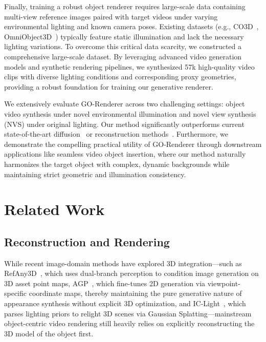 \documentclass[runningheads]{llncs}
\begin{document}
Finally, training a robust object renderer requires large-scale data containing multi-view reference images paired with target videos under varying environmental lighting and known camera poses. Existing datasets (e.g., CO3D~\cite{co3d}, OmniObject3D~\cite{omniobject3d}) typically feature static illumination and lack the necessary lighting variations. To overcome this critical data scarcity, we constructed a comprehensive large-scale dataset. By leveraging advanced video generation models and synthetic rendering pipelines, we synthesized 57k high-quality video clips with diverse lighting conditions and corresponding proxy geometries, providing a robust foundation for training our generative renderer.

We extensively evaluate GO-Renderer across two challenging settings: object video synthesis under novel environmental illumination and novel view synthesis (NVS) under original lighting. Our method significantly outperforms current state-of-the-art diffusion~\cite{videoxfun} or reconstruction methods~\cite{anysplat,reconviagen}. Furthermore, we demonstrate the compelling practical utility of GO-Renderer through downstream applications like seamless video object insertion, where our method naturally harmonizes the target object with complex, dynamic backgrounds while maintaining strict geometric and illumination consistency.


\section{Related Work}
\label{sec:related}

\subsection{Reconstruction and Rendering}
While recent image-domain methods have explored 3D integration—such as RefAny3D~\cite{refany3d}, which uses dual-branch perception to condition image generation on 3D asset point maps, AGP~\cite{sweetdreamer}, which fine-tunes 2D generation via viewpoint-specific coordinate maps, thereby maintaining the pure generative nature of appearance synthesis without explicit 3D optimization, and IC-Light~\cite{iclight}, which parses lighting priors to relight 3D scenes via Gaussian Splatting—mainstream object-centric video rendering still heavily relies on explicitly reconstructing the 3D model of the object first.
\end{document}
